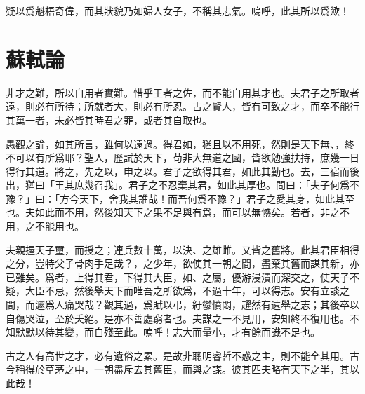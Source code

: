 疑以爲魁梧奇偉，而其狀貌乃如婦人女子，不稱其志氣。嗚呼，此其所以爲歟！

\theendnotes

\section[賈誼論\quad{\small 蘇軾}]{{\normalsize 蘇軾}\quad{}論}
非才之難，所以自用者實難。惜乎王者之佐，而不能自用其才也。夫君子之所取者遠，則必有所待；所就者大，則必有所忍。古之賢人，皆有可致之才，而卒不能行其萬一者，未必皆其時君之罪，或者其自取也。

愚觀之論，如其所言，雖何以遠過。得君如，猶且以不用死，然則是天下無、，終不可以有所爲耶？聖人，歷試於天下，苟非大無道之國，皆欲勉強扶持，庶幾一日得行其道。將之，先之以，申之以。君子之欲得其君，如此其勤也。去，三宿而後出，猶曰「王其庶幾召我」。君子之不忍棄其君，如此其厚也。問曰：「夫子何爲不豫？」曰：「方今天下，舍我其誰哉！而吾何爲不豫？」君子之愛其身，如此其至也。夫如此而不用，然後知天下之果不足與有爲，而可以無憾矣。若者，非之不用，之不能用也。%

夫親握天子璽，而授之；連兵數十萬，以決、之雄雌。又皆之舊將。此其君臣相得之分，豈特父子骨肉手足哉？，之少年，欲使其一朝之間，盡棄其舊而謀其新，亦已難矣。爲者，上得其君，下得其大臣，如、之屬，優游浸漬而深交之，使天子不疑，大臣不忌，然後舉天下而唯吾之所欲爲，不過十年，可以得志。安有立談之間，而遽爲人痛哭哉？觀其過，爲賦以弔，{紆鬱憤悶}，趯然有遠舉之志；其後卒以自傷哭泣，至於夭絕。是亦不善處窮者也。夫謀之一不見用，安知終不復用也。不知默默以待其變，而自殘至此。嗚呼！志大而量小，才有餘而識不足也。%

古之人有高世之才，必有遺俗之累。是故非聰明睿哲不惑之主，則不能全其用。古今稱得於草茅之中，一朝盡斥去其舊臣，而與之謀。彼其匹夫略有天下之半，其以此哉！

